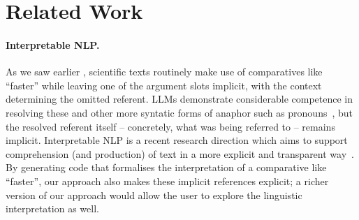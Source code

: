 \section{Related Work}
\label{sec:related}

\paragraph{Interpretable NLP.}

As we saw earlier , scientific texts routinely make use of comparatives like ``faster'' while
leaving one of the argument slots implicit, with the context determining the omitted referent. LLMs
demonstrate considerable competence in resolving these and other more syntatic forms of anaphor such as
pronouns~\citep{zhu25}, but the resolved referent itself -- concretely, what was being referred to -- remains
implicit. Interpretable NLP is a recent research direction which aims to support comprehension (and
production) of text in a more explicit and transparent way~\citep{yulan23}. By generating code that formalises
the interpretation of a comparative like ``faster'', our approach also makes these implicit references
explicit; a richer version of our approach would allow the user to explore the linguistic interpretation as
well. 
